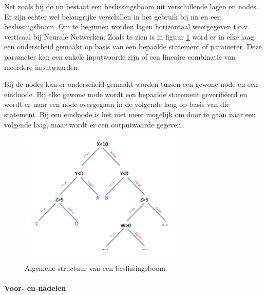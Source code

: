 		
		Net zoals bij de \gls{nn} bestaat een beslissingsboom uit verschillende lagen en nodes. Er zijn echter wel belangrijke verschillen in het gebruik bij \gls{nn} en een beslissingsboom. Om te beginnen worden lagen horizontaal weergegeven t.o.v. verticaal bij Neurale Netwerken. Zoals te zien is in figuur \ref{fig:beslissingsBoom} word er in elke laag een onderscheid gemaakt op basis van een bepaalde statement of parameter. Deze parameter kan een enkele inputwaarde zijn of een lineaire combinatie van meerdere inputwaarden. 
		
		Bij de nodes kan er onderscheid gemaakt worden tussen een gewone node en een eindnode. Bij elke gewone node wordt een bepaalde statement geverifi\"eerd en wordt er naar een node overgegaan in de volgende laag op basis van die statement. Bij een eindnode is het niet meer mogelijk om door te gaan naar een volgende laag, maar wordt er een outputwaarde gegeven.
		
		\begin{figure}
			\centering
			\includegraphics[width=80mm]{afbeeldingen/beslissingsBoom.PNG}
			\caption{Algemene structuur van een beslissingsboom.}
			\label{fig:beslissingsBoom}
		\end{figure}
		
		\paragraph{Voor- en nadelen}
		
	
	
